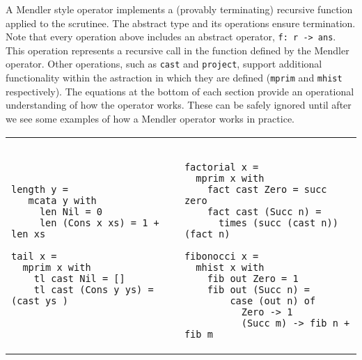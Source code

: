 A Mendler style operator implements a (provably terminating) recursive function
applied to the scrutinee. The abstract type and its operations ensure termination.
Note that every operation above includes an abstract operator, \verb+f: r -> ans+. 
This operation represents a recursive call in the function defined by the Mendler
operator. Other operations, such as \verb+cast+ and \verb+project+, support additional
functionality within the astraction in which they are defined (\verb+mprim+ and \verb+mhist+ respectively).
The equations at the bottom of each section provide an operational
understanding of how the operator works. These can be safely ignored until after
we see some examples of how a Mendler operator works in practice.

\vspace*{.1in}
\begin{tabular}{l|l}
\begin{minipage}[l]{.42\linewidth}
{\small
\begin{verbatim}
length y = 
   mcata y with
     len Nil = 0
     len (Cons x xs) = 1 + len xs

tail x = 
  mprim x with
    tl cast Nil = []
    tl cast (Cons y ys) = (cast ys )
\end{verbatim}}
\end{minipage}

& 

\begin{minipage}[l]{.50\linewidth}
{\small
\begin{verbatim}

factorial x =
  mprim x with
    fact cast Zero = succ zero
    fact cast (Succ n) = 
      times (succ (cast n)) (fact n)
                      
fibonocci x =
  mhist x with
    fib out Zero = 1
    fib out (Succ n) = 
        case (out n) of
          Zero -> 1
          (Succ m) -> fib n + fib m 
\end{verbatim}}
\end{minipage}
\end{tabular}
\vspace*{.1in}

